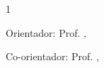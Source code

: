 \newpage
\thispagestyle{empty}
\makeatletter
\begin{spacing}{1}
	\begin{center}


		\@author

		\vspace{3cm}
		\MakeUppercase{\@title}\@subtitulo
	\end{center}

	\vspace{2cm}
	\hfill\parbox{9.3cm}{\noindent\justifying\nohyphens{\@textofolharosto}}

	\vspace{3cm}
	Orientador: Prof. \@orientador, \@orientadorestitulo

	Co-orientador: Prof. \@coorientador, \@orientadorestitulo

	\vspace*{\fill}
	\begin{center}
		\@cidade\\
		\@date
	\end{center}

\end{spacing}
\makeatother